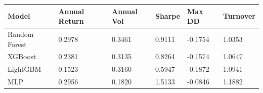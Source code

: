 \begin{tabular}{llllll}
\toprule
Model & Annual Return & Annual Vol & Sharpe & Max DD & Turnover \\
\midrule
Random Forest & 0.2978 & 0.3461 & 0.9111 & -0.1754 & 1.0353 \\
XGBoost & 0.2381 & 0.3135 & 0.8264 & -0.1574 & 1.0647 \\
LightGBM & 0.1523 & 0.3160 & 0.5947 & -0.1872 & 1.0941 \\
MLP & 0.2956 & 0.1820 & 1.5133 & -0.0846 & 1.1882 \\
\bottomrule
\end{tabular}
